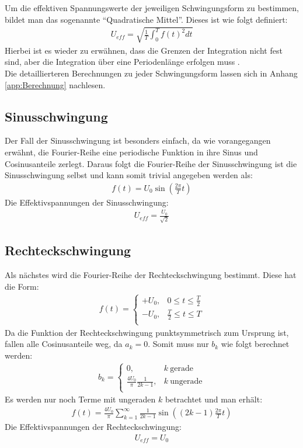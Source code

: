Um die effektiven Spannungswerte der jeweiligen Schwingungsform zu bestimmen, bildet man das sogenannte \enquote{Quadratische Mittel}. Dieses ist wie folgt definiert:
\begin{gather}
    U_{eff} = \sqrt{\frac{1}{T}\int^T_0 f(t)^2 dt}
\end{gather}
Hierbei ist es wieder zu erwähnen, dass die Grenzen der Integration nicht fest sind, aber die Integration über eine Periodenlänge erfolgen muss \citep{messtechnik}.\\

Die detaillierteren Berechnungen zu jeder Schwingungsform lassen sich in Anhang \ref{app:Berechnung} nachlesen.

\subsection*{Sinusschwingung}
\label{sub:sinus}
Der Fall der Sinusschwingung ist besonders einfach, da wie vorangegangen erwähnt, die Fourier-Reihe eine periodische Funktion in ihre Sinus und Cosinusanteile zerlegt. Daraus folgt die Fourier-Reihe der Sinusschwingung ist die Sinusschwingung selbst und kann somit trivial angegeben werden als:
\begin{gather}
    \boxed{f(t) = U_0\sin(\frac{2\pi}{T} t)}
\end{gather}
Die Effektivspannungen der Sinusschwingung:
\begin{gather}
    \boxed{U_{eff}=\frac{U_0}{\sqrt{2}}}
\end{gather}

\subsection*{Rechteckschwingung}
\label{sub:square}
Als nächstes wird die Fourier-Reihe der Rechteckschwingung bestimmt. Diese hat die Form:
\begin{gather}
    f(t) = 
    \begin{cases}
        +U_0, & 0 \leq t \leq \frac{T}{2} \\
        -U_0, & \frac{T}{2} \leq t \leq T \\
    \end{cases}
\end{gather}
Da die Funktion der Rechteckschwingung punktsymmetrisch zum Ursprung ist, fallen alle Cosinusanteile weg, da $a_k = 0$. Somit muss nur $b_k$ wie folgt berechnet werden:
\begin{gather}
    b_k =
    \begin{cases}
        0, & k~\text{gerade}\\
        \frac{4U_0}{\pi}\frac{1}{2k-1}, & k~\text{ungerade}\\
    \end{cases}
\end{gather} 
Es werden nur noch Terme mit ungeraden $k$ betrachtet und man erhält:
\begin{gather}
    \boxed{f(t) = \frac{4U_0}{\pi} \sum^{\infty}_{k=1} \frac{1}{2k-1} \sin((2k-1)\frac{2\pi}{T}t)}
\end{gather}
Die Effektivspannungen der Rechteckschwingung:
\begin{gather}
    \boxed{U_{eff} = U_0}
\end{gather}
